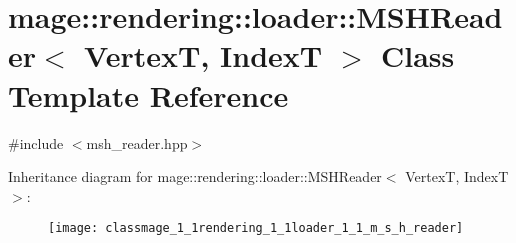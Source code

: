 \hypertarget{classmage_1_1rendering_1_1loader_1_1_m_s_h_reader}{}\section{mage\+:\+:rendering\+:\+:loader\+:\+:M\+S\+H\+Reader$<$ VertexT, IndexT $>$ Class Template Reference}
\label{classmage_1_1rendering_1_1loader_1_1_m_s_h_reader}


{\ttfamily \#include $<$msh\+\_\+reader.\+hpp$>$}

Inheritance diagram for mage\+:\+:rendering\+:\+:loader\+:\+:M\+S\+H\+Reader$<$ VertexT, IndexT $>$\+:\begin{figure}[H]
\begin{center}
\leavevmode
\texttt{[image: classmage\_1\_1rendering\_1\_1loader\_1\_1\_m\_s\_h\_reader]}
\end{center}
\end{figure}
